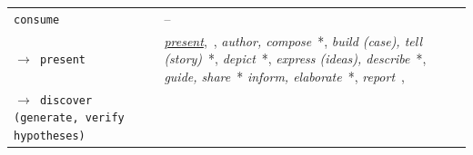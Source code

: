 
\begin{table}\renewcommand{\arraystretch}{1.2}\addtolength{\tabcolsep}{-1pt}
    \begin{center}
    \tiny
    \begin{tabular}{p{}>{\RaggedRight}p{}}
    
    \rowcolor{yellow!20} 
    
        \multicolumn{2}{c}{\it why?} 
        
    \\
    
    \hline
    
    \rowcolor{blue!10}
    
        {\tt consume}\index{{\tt consume}} & --
    
    \\
    
        {\tt $\rightarrow$ present}\index{{\tt present}} &
    
        	{\it \underline{present}},~\cite{Shrinivasan2008,vanWijk2006}, %
        	{\it author, compose}~\cite{Card1999}*,
        	{\it build (case), tell (story)}~\cite{Pirolli2005}*,
        	{\it depict}~\cite{Pike2009}*,
        	{\it express (ideas), describe}~\cite{Springmeyer1992}*,
        	{\it guide, share}~\cite{Heer2012}*
        	{\it inform, elaborate}~\cite{Zhou1998}*,
        	{\it report}~\cite{Kandel2012},
    
    \\ \rowcolor{gray!10}
    
        {\tt $\rightarrow$ discover (generate\index{{\tt discover}}, verify\index{{\tt discover}} hypotheses)}\index{{\tt discover}} &
    

\end{tabular}
\end{center}
\end{table}

